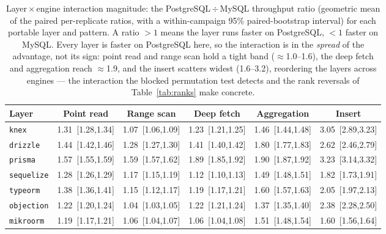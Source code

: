 \begin{table}[htbp]
  \centering
  \small
  \caption{Layer\,$\times$\,engine interaction magnitude: the PostgreSQL\,$\div$\,MySQL
    throughput ratio (geometric mean of the paired per-replicate ratios, with a within-campaign 95\%
    paired-bootstrap interval) for each portable layer and pattern. A ratio $>1$ means
    the layer runs faster on PostgreSQL, $<1$ faster on MySQL. Every layer is faster on
    PostgreSQL here, so the interaction is in the \emph{spread} of the advantage, not its
    sign: point read and range scan hold a tight band ($\approx$1.0--1.6), the deep fetch
    and aggregation reach $\approx$1.9, and the insert scatters widest (1.6--3.2), reordering
    the layers across engines --- the
    interaction the blocked permutation test detects and the rank reversals of
    Table~\ref{tab:ranks} make concrete.}
  \label{tab:interaction}
  \begin{adjustbox}{max width=\textwidth}
  \begin{tabular}{l ccccc}
    \toprule
    Layer & Point read & Range scan & Deep fetch & Aggregation & Insert \\
    \midrule
    \texttt{knex} & 1.31~[1.28,1.34] & 1.07~[1.06,1.09] & 1.23~[1.21,1.25] & 1.46~[1.44,1.48] & 3.05~[2.89,3.23] \\
    \texttt{drizzle} & 1.44~[1.42,1.46] & 1.28~[1.27,1.30] & 1.41~[1.40,1.42] & 1.80~[1.77,1.83] & 2.62~[2.46,2.79] \\
    \texttt{prisma} & 1.57~[1.55,1.59] & 1.59~[1.57,1.62] & 1.89~[1.85,1.92] & 1.90~[1.87,1.92] & 3.23~[3.14,3.32] \\
    \texttt{sequelize} & 1.28~[1.26,1.29] & 1.17~[1.15,1.19] & 1.12~[1.10,1.13] & 1.49~[1.48,1.51] & 1.82~[1.73,1.91] \\
    \texttt{typeorm} & 1.38~[1.36,1.41] & 1.15~[1.12,1.17] & 1.19~[1.17,1.21] & 1.60~[1.57,1.63] & 2.05~[1.97,2.13] \\
    \texttt{objection} & 1.22~[1.20,1.24] & 1.04~[1.03,1.05] & 1.22~[1.21,1.24] & 1.37~[1.35,1.40] & 2.38~[2.28,2.50] \\
    \texttt{mikroorm} & 1.19~[1.17,1.21] & 1.06~[1.04,1.07] & 1.06~[1.04,1.08] & 1.51~[1.48,1.54] & 1.60~[1.56,1.64] \\
    \bottomrule
  \end{tabular}
  \end{adjustbox}
\end{table}

